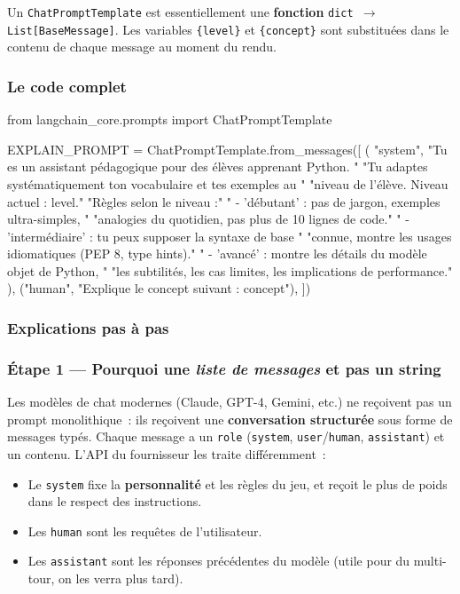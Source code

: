 \documentclass[11pt,a4paper]{article}
\begin{document}
Un \texttt{ChatPromptTemplate} est essentiellement une \textbf{fonction}
\texttt{dict $\to$ List[BaseMessage]}. Les variables \texttt{\{level\}} et
\texttt{\{concept\}} sont substituées dans le contenu de chaque message au
moment du rendu.

\subsubsection{Le code complet}

\begin{pythoncode}
from langchain_core.prompts import ChatPromptTemplate

EXPLAIN_PROMPT = ChatPromptTemplate.from_messages([
    (
        "system",
        "Tu es un assistant pédagogique pour des élèves apprenant Python. "
        "Tu adaptes systématiquement ton vocabulaire et tes exemples au "
        "niveau de l'élève. Niveau actuel : {level}.\n\n"
        "Règles selon le niveau :\n"
        "  - 'débutant' : pas de jargon, exemples ultra-simples, "
        "analogies du quotidien, pas plus de 10 lignes de code.\n"
        "  - 'intermédiaire' : tu peux supposer la syntaxe de base "
        "connue, montre les usages idiomatiques (PEP 8, type hints).\n"
        "  - 'avancé' : montre les détails du modèle objet de Python, "
        "les subtilités, les cas limites, les implications de performance."
    ),
    ("human", "Explique le concept suivant : {concept}"),
])
\end{pythoncode}

\subsubsection{Explications pas à pas}

\subsubsection*{Étape 1 — Pourquoi une \emph{liste de messages} et pas un string}

Les modèles de chat modernes (Claude, GPT-4, Gemini, etc.) ne reçoivent pas
un prompt monolithique~: ils reçoivent une \textbf{conversation structurée}
sous forme de messages typés. Chaque message a un \texttt{role}
(\texttt{system}, \texttt{user}/\texttt{human}, \texttt{assistant}) et un
contenu. L'API du fournisseur les traite différemment~:

\begin{itemize}[leftmargin=*]
  \item Le \texttt{system} fixe la \textbf{personnalité} et les règles du
        jeu, et reçoit le plus de poids dans le respect des instructions.
  \item Les \texttt{human} sont les requêtes de l'utilisateur.
  \item Les \texttt{assistant} sont les réponses précédentes du modèle
        (utile pour du multi-tour, on les verra plus tard).
\end{itemize}
\end{document}
